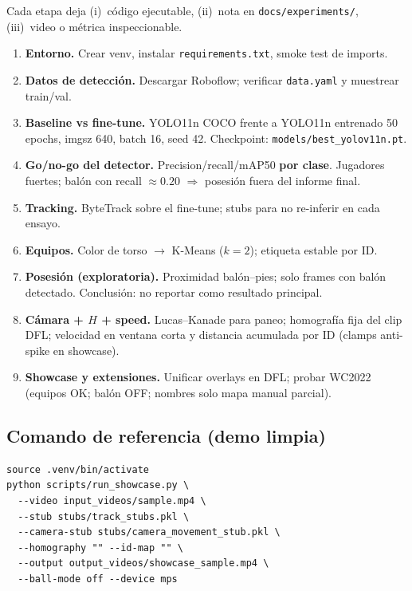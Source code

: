 \documentclass[11pt,a4paper]{article}
\begin{document}
Cada etapa deja (i)~código ejecutable, (ii)~nota en \texttt{docs/experiments/}, (iii)~video o métrica inspeccionable.

\begin{enumerate}[leftmargin=*,itemsep=4pt]
  \item \textbf{Entorno.} Crear venv, instalar \texttt{requirements.txt}, smoke test de imports.
  \item \textbf{Datos de detección.} Descargar Roboflow; verificar \texttt{data.yaml} y muestrear train/val.
  \item \textbf{Baseline vs fine-tune.} YOLO11n COCO frente a YOLO11n entrenado 50 epochs, imgsz 640, batch 16, seed 42. Checkpoint: \texttt{models/best\_yolov11n.pt}.
  \item \textbf{Go/no-go del detector.} Precision/recall/mAP50 \textbf{por clase}. Jugadores fuertes; balón con recall $\approx 0.20$ $\Rightarrow$ posesión fuera del informe final.
  \item \textbf{Tracking.} ByteTrack sobre el fine-tune; stubs para no re-inferir en cada ensayo.
  \item \textbf{Equipos.} Color de torso $\rightarrow$ K-Means ($k{=}2$); etiqueta estable por ID.
  \item \textbf{Posesión (exploratoria).} Proximidad balón--pies; solo frames con balón detectado. Conclusión: no reportar como resultado principal.
  \item \textbf{Cámara + $H$ + speed.} Lucas--Kanade para paneo; homografía fija del clip DFL; velocidad en ventana corta y distancia acumulada por ID (clamps anti-spike en showcase).
  \item \textbf{Showcase y extensiones.} Unificar overlays en DFL; probar WC2022 (equipos OK; balón OFF; nombres solo mapa manual parcial).
\end{enumerate}

\subsection{Comando de referencia (demo limpia)}

\begin{lstlisting}
source .venv/bin/activate
python scripts/run_showcase.py \
  --video input_videos/sample.mp4 \
  --stub stubs/track_stubs.pkl \
  --camera-stub stubs/camera_movement_stub.pkl \
  --homography "" --id-map "" \
  --output output_videos/showcase_sample.mp4 \
  --ball-mode off --device mps
\end{lstlisting}
\end{document}
